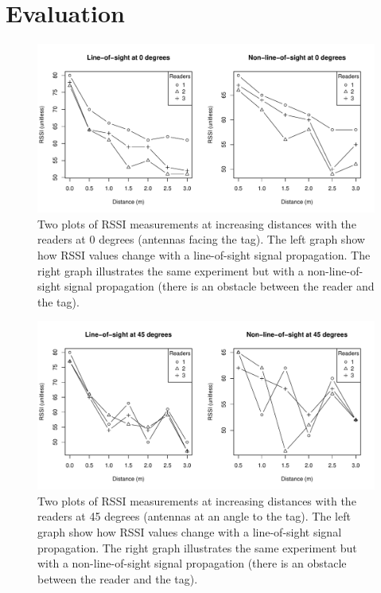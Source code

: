 \chapter{Evaluation}
\label{ch:evaluation}

\begin{figure}
	\begin{center}
		\includegraphics[width=1\textwidth]{figures/rssi_distance_3m_0deg}
		\caption{Two plots of RSSI measurements at increasing distances with the readers at 0 degrees (antennas facing the tag). The left graph show how RSSI values change with a line-of-sight signal propagation. The right graph illustrates the same experiment but with a non-line-of-sight signal propagation (there is an obstacle between the reader and the tag).}
	\end{center}
\end{figure}
\begin{figure}
	\begin{center}
		\includegraphics[width=1\textwidth]{figures/rssi_distance_3m_45deg}
		\caption{Two plots of RSSI measurements at increasing distances with the readers at 45 degrees (antennas at an angle to the tag). The left graph show how RSSI values change with a line-of-sight signal propagation. The right graph illustrates the same experiment but with a non-line-of-sight signal propagation (there is an obstacle between the reader and the tag).}
	\end{center}
\end{figure}
